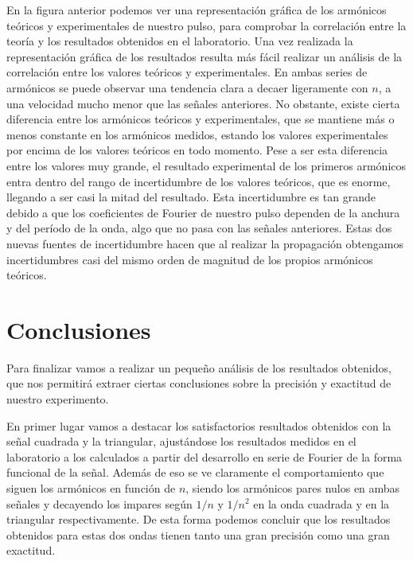 \documentclass[a4paper,12pt,titlepage]{article}
\begin{document}
En la figura anterior podemos ver una representación gráfica de los armónicos teóricos y experimentales de nuestro pulso, para comprobar la correlación entre la teoría y los resultados obtenidos en el laboratorio. Una vez realizada la representación gráfica de los resultados resulta más fácil realizar un análisis de la correlación entre los valores teóricos y experimentales. En ambas series de armónicos se puede observar una tendencia clara a decaer ligeramente con $n$, a una velocidad mucho menor que las señales anteriores. No obstante, existe cierta diferencia entre los armónicos teóricos y experimentales, que se mantiene más o menos constante en los armónicos medidos, estando los valores experimentales por encima de los valores teóricos en todo momento. Pese a ser esta diferencia entre los valores muy grande, el resultado experimental de los primeros armónicos entra dentro del rango de incertidumbre de los valores teóricos, que es enorme, llegando a ser casi la mitad del resultado. Esta incertidumbre es tan grande debido a que los coeficientes de Fourier de nuestro pulso dependen de la anchura y del período de la onda, algo que no pasa con las señales anteriores. Estas dos nuevas fuentes de incertidumbre hacen que al realizar la propagación obtengamos incertidumbres casi del mismo orden de magnitud de los propios armónicos teóricos.



\section{Conclusiones}

Para finalizar vamos a realizar un pequeño análisis de los resultados obtenidos, que nos permitirá extraer ciertas conclusiones sobre la precisión y exactitud de nuestro experimento.

En primer lugar vamos a destacar los satisfactorios resultados obtenidos con la señal cuadrada y la triangular, ajustándose los resultados medidos en el laboratorio a los calculados a partir del desarrollo en serie de Fourier de la forma funcional de la señal. Además de eso se ve claramente el comportamiento que siguen los armónicos en función de $n$, siendo los armónicos pares nulos en ambas señales y decayendo los impares según $1/n$ y $1/n^2$ en la onda cuadrada y en la triangular respectivamente. De esta forma podemos concluir que los resultados obtenidos para estas dos ondas tienen tanto una gran precisión como una gran exactitud.
\end{document}
